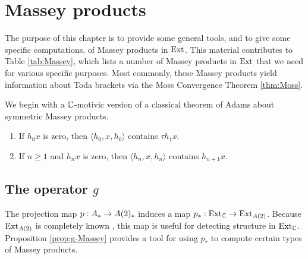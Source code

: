 \chapter{Massey products}
\label{ch:Massey}

The purpose of this chapter is to provide some general tools,
and to give some specific computations, of Massey products in
$\operatorname{Ext}$.  This material contributes to Table \ref{tab:Massey},
which lists a number of Massey products in $\operatorname{Ext}$ that we need
for various specific purposes.  Most commonly, these Massey
products yield information about Toda brackets via
the Moss Convergence Theorem \ref{thm:Moss}.

We begin with a $\mathbb{C}$-motivic version of a classical theorem of
Adams about symmetric Massey products.


\begin{thm}
\label{thm:Massey-symmetric}
\mbox{}
\begin{enumerate}
\item
If $h_0 x$ is zero, then $\langle h_0, x, h_0 \rangle$ contains 
$\tau h_1 x$.
\item
If $n \geq 1$ and $h_n x$ is zero, then 
$\langle h_n, x, h_n \rangle$ contains $h_{n+1} x$.
\end{enumerate}
\end{thm}





\section{The operator $g$}

The projection map $p:A_* \rightarrow A(2)_*$ induces a map
$p_*: \operatorname{Ext}_{\mathbb{C}} \rightarrow \operatorname{Ext}_{A(2)}$.
Because $\operatorname{Ext}_{A(2)}$ is completely known \cite{Isaksen09},
this map is useful for detecting structure in
$\operatorname{Ext}_{\mathbb{C}}$.  Proposition \ref{prop:g-Massey} provides a tool
for using $p_*$ to compute certain types of Massey products.

